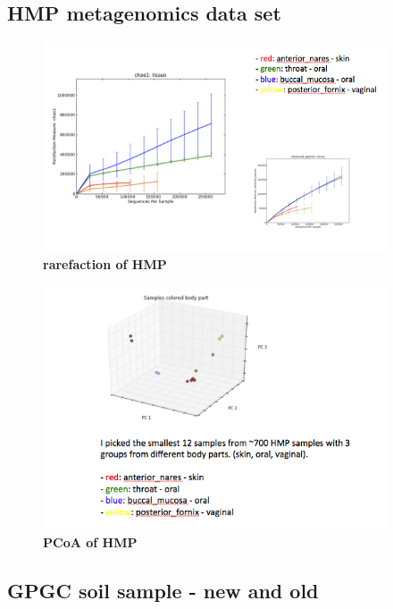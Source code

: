 \documentclass{article}
\begin{document}


\subsection{HMP metagenomics data set}

\begin{figure}[!ht]
 \centerline{\includegraphics[width=4in]{./figures/HMP_alpha.png}}
\caption{\bf rarefaction of HMP}
\label{fig:concept}
\end{figure}

\begin{figure}[!ht]
 \centerline{\includegraphics[width=4in]{./figures/HMP_beta.png}}
\caption{\bf PCoA of HMP}
\label{fig:concept}
\end{figure}



\subsection{GPGC soil sample - new and old}
\end{document}

